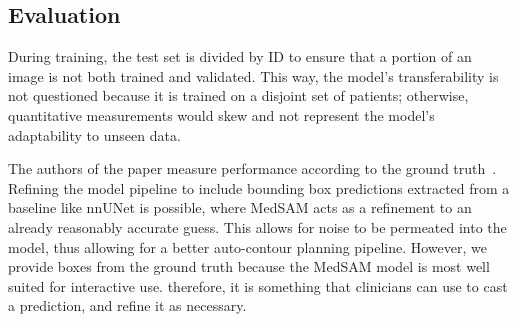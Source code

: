 \documentclass[11pt,twoside]{report}
\begin{document}



\subsection{Evaluation}

During training, the test set is divided by ID to ensure that a portion of an image is not both trained and validated. This way, the model's transferability is not questioned because it is trained on a disjoint set of patients; otherwise, quantitative measurements would skew and not represent the model's adaptability to unseen data.


The authors of the paper measure performance according to the ground truth~\cite{SAM, Ma2024}. Refining the model pipeline to include bounding box predictions extracted from a baseline like nnUNet is possible, where MedSAM acts as a refinement to an already reasonably accurate guess. This allows for noise to be permeated into the model, thus allowing for a better auto-contour planning pipeline. However, we provide boxes from the ground truth because the MedSAM model is most well suited for interactive use. therefore, it is something that clinicians can use to cast a prediction, and refine it as necessary.
\end{document}
